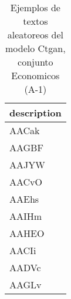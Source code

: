 \begin{table}[H]
\centering
\fontsize{8}{14}\selectfont
\caption{Ejemplos de textos aleatoreos del modelo Ctgan, conjunto Economicos (A-1)}
\label{table-sample10-economicos-a-1-ctgan-text}
\begin{tabular}{|m{50em}|}
\hline
\rowcolor[gray]{0.8}
description \\
\hline AACak \\
\hline AAGBF \\
\hline AAJYW \\
\hline AACvO \\
\hline AAEhs \\
\hline AAIHm \\
\hline AAHEO \\
\hline AACIi \\
\hline AADVc \\
\hline AAGLv \\
\hline
\end{tabular}
\end{table}
